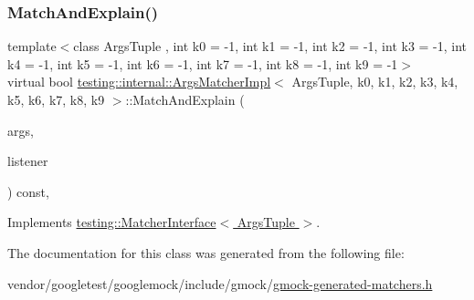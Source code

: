 \mbox{\label{classtesting_1_1internal_1_1_args_matcher_impl_a60383b3073a61f9d82cbf31fe19e6bfa}} 
\subsubsection{\texorpdfstring{Match\+And\+Explain()}{MatchAndExplain()}}
{\footnotesize\ttfamily template$<$class Args\+Tuple , int k0 = -\/1, int k1 = -\/1, int k2 = -\/1, int k3 = -\/1, int k4 = -\/1, int k5 = -\/1, int k6 = -\/1, int k7 = -\/1, int k8 = -\/1, int k9 = -\/1$>$ \\
virtual bool \hyperlink{classtesting_1_1internal_1_1_args_matcher_impl}{testing\+::internal\+::\+Args\+Matcher\+Impl}$<$ Args\+Tuple, k0, k1, k2, k3, k4, k5, k6, k7, k8, k9 $>$\+::Match\+And\+Explain (\begin{DoxyParamCaption}\item[{Args\+Tuple}]{args,  }\item[{\hyperlink{classtesting_1_1_match_result_listener}{Match\+Result\+Listener} $\ast$}]{listener }\end{DoxyParamCaption}) const\hspace{0.3cm}{\ttfamily [inline]}, {\ttfamily [virtual]}}



Implements \hyperlink{classtesting_1_1_matcher_interface_a296b43607cd99d60365f0e6a762777cf}{testing\+::\+Matcher\+Interface$<$ Args\+Tuple $>$}.



The documentation for this class was generated from the following file\+:\begin{DoxyCompactItemize}
\item 
vendor/googletest/googlemock/include/gmock/\hyperlink{gmock-generated-matchers_8h}{gmock-\/generated-\/matchers.\+h}\end{DoxyCompactItemize}
